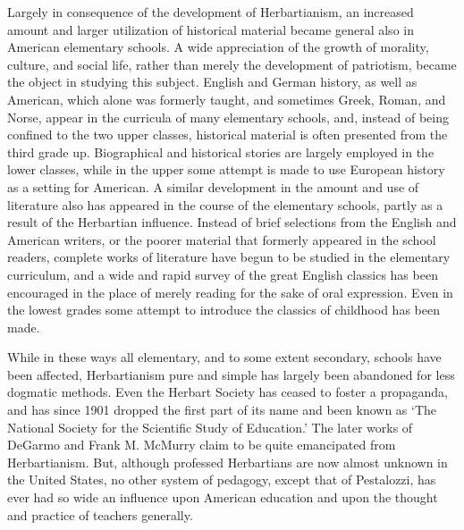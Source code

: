 \documentclass[
]{book}
\begin{document}
Largely in consequence of the development of Herbartianism, an increased amount and larger utilization of historical material became general also in American elementary schools. A wide appreciation of the growth of morality, culture, and social life, rather than merely the development of patriotism, became the object in studying this subject. English and German history, as well as American, which alone was formerly taught, and sometimes Greek, Roman, and Norse, appear in the curricula of many elementary schools, and, instead of being confined to the two upper classes, historical material is often presented from the third grade up. Biographical and historical stories are largely employed in the lower classes, while in the upper some attempt is made to use European history as a setting for American. A similar development in the amount and use of literature also has appeared in the course of the elementary schools, partly as a result of the Herbartian influence. Instead of brief selections from the English and American writers, or the poorer material that formerly appeared in the school readers, complete works of literature have begun to be studied in the elementary curriculum, and a wide and rapid survey of the great English classics has been encouraged in the place of merely reading for the sake of oral expression. Even in the lowest grades some attempt to introduce the classics of childhood has been made.

While in these ways all elementary, and to some extent secondary, schools have been affected, Herbartianism pure and simple has largely been abandoned for less dogmatic methods. Even the Herbart Society has ceased to foster a propaganda, and has since 1901 dropped the first part of its name and been known as `The National Society for the Scientific Study of Education.' The later works of DeGarmo and Frank M. McMurry claim to be quite emancipated from Herbartianism. But, although professed Herbartians are now almost unknown in the United States, no other system of pedagogy, except that of Pestalozzi, has ever had so wide an influence upon American education and upon the thought and practice of teachers generally.
\end{document}
